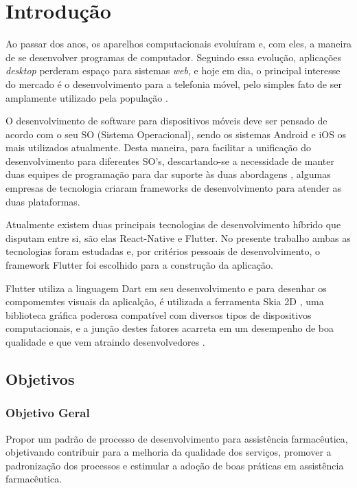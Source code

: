
\chapter{Introdução}\label{intro}

Ao passar dos anos, os aparelhos computacionais evoluíram e, com eles, a maneira de se desenvolver programas de computador. Seguindo essa evolução, aplicações \textit{desktop} perderam espaço para sistemas \textit{web}, e hoje em dia, o principal interesse do mercado é o desenvolvimento para a telefonia móvel, pelo simples fato de ser amplamente utilizado pela população \cite{leite2017comparativo}.

O desenvolvimento de software para dispositivos móveis deve ser pensado de acordo com o seu SO (Sistema Operacional), sendo os sistemas Android  e iOS  os mais utilizados atualmente. Desta maneira, para facilitar a unificação do desenvolvimento para diferentes SO's, descartando-se a necessidade de manter duas equipes de programação para dar suporte às duas abordagens , algumas empresas de tecnologia criaram frameworks de desenvolvimento para atender as duas plataformas.

Atualmente existem duas principais tecnologias de desenvolvimento híbrido que disputam entre si, são elas React-Native e Flutter. No presente trabalho ambas as tecnologias foram estudadas e, por critérios pessoais de desenvolvimento, o framework Flutter foi escolhido para a construção da aplicação.

Flutter utiliza a linguagem Dart em seu desenvolvimento e para desenhar os compomemtes visuais da aplicalção, é utilizada a ferramenta Skia 2D , uma biblioteca gráfica poderosa compatível com diversos tipos de dispositivos computacionais, e a junção destes fatores acarreta em um desempenho de boa qualidade e que vem atraindo desenvolvedores \cite{zammetti2019practical}.

\section{Objetivos}
\subsection{Objetivo Geral }

Propor um padrão de processo de desenvolvimento para assistência farmacêutica, objetivando contribuir para a melhoria da qualidade dos serviços, promover a padronização dos processos e estimular a adoção de boas práticas em assistência farmacêutica.

